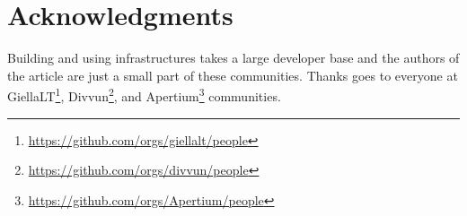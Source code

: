 \documentclass[free]{flammie}
\begin{document}
\section*{Acknowledgments}

Building and using infrastructures takes a large developer base and the authors of the article are just a small part of these communities.
Thanks goes to everyone at GiellaLT\footnote{\url{https://github.com/orgs/giellalt/people}}, Divvun\footnote{\url{https://github.com/orgs/divvun/people}}, and Apertium\footnote{\url{https://github.com/orgs/Apertium/people}} communities.



\end{document}
